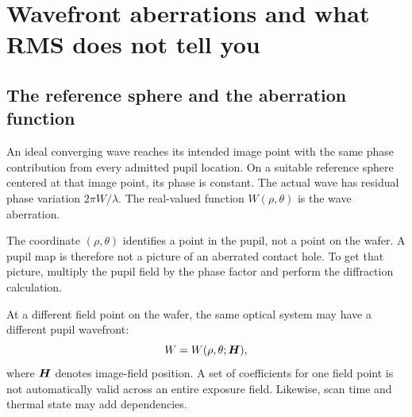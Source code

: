 \chapter{Wavefront aberrations and what RMS does not tell you}\label{ch:aberration}

\section{The reference sphere and the aberration function}
An ideal converging wave reaches its intended image point with the same
phase contribution from every admitted pupil location. On a suitable
reference sphere centered at that image point, its phase is constant.
The actual wave has residual phase variation $2\pi W/\lambda$.
The real-valued function $W(\rho,\theta)$ is the wave aberration.

The coordinate $(\rho,\theta)$ identifies a point in the pupil, not
a point on the wafer. A pupil map is therefore not a picture of an
aberrated contact hole. To get that picture, multiply the pupil field by
the phase factor and perform the diffraction calculation.

At a different field point on the wafer, the same optical system may
have a different pupil wavefront:
\[
W=W(\rho,\theta;\bm{H}),
\]
where $\bm{H}$ denotes image-field position. A set of coefficients for
one field point is not automatically valid across an entire exposure
field. Likewise, scan time and thermal state may add dependencies.

